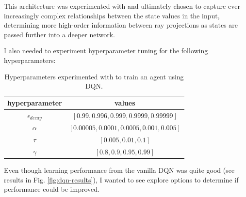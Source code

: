 \documentclass[11pt]{article}
\begin{document}
 \FloatBarrier
 
  This architecture was experimented with and ultimately chosen to capture ever-increasingly complex relationships between the state values in the input, determining more high-order information between ray projections as states are passed further into a deeper network.

I also needed to experiment hyperparameter tuning for the following hyperparameters:

\FloatBarrier

\begin{table}[!ht]
	\centering
	\begin{tabular}{ c | c }
	\textbf{hyperparameter} & \textbf{values} \\
	\hline
	$\epsilon_{decay}$ & $[0.99, 0.996, 0.999, 0.9999, 0.99999]$ \\
	$\alpha$ & $[0.00005, 0.0001, 0.0005, 0.001, 0.005]$ \\
	$\tau$ & $[0.005, 0.01, 0.1]$ \\
	$\gamma$ & $[0.8, 0.9, 0.95, 0.99]$ \\
	\hline
	\end{tabular}
	\caption{Hyperparameters experimented with to train an agent using DQN.}
	\label{tbl:hyperparameters}
\end{table}

\FloatBarrier

Even though learning performance from the vanilla DQN was quite good (see results in
Fig. \ref{fig:dqn-results}), I wanted to see explore options to determine if
performance could be improved.
%
%
%
%
%
\end{document}
